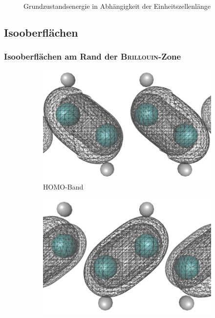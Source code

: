 \begin{frame}
\begin{minipage}{0.49\textwidth}
\begin{figure}
\captionsetup{justification = centering}
\caption{Grundzustandsenergie in Abhängigkeit der Einheitszellenlänge}
\label{image_poly_cell_len}
\end{figure}
\end{minipage}
\end{frame}

\subsection{Isooberflächen}
\begin{frame}
\frametitle{Isooberflächen am Rand der \textsc{Brillouin}-Zone}
\begin{figure}
\centering
\begin{subfigure}{0.4\textwidth}
\includegraphics[width = \textwidth]{Images/polyacetylene/wavefunctions/Homo_Cut}
\caption{HOMO-Band}
\label{image_homo1}
\end{subfigure}\hspace*{2cm}
\begin{subfigure}{0.4\textwidth}
\centering
\includegraphics[width = \textwidth]{Images/polyacetylene/wavefunctions/LUMO_Cut}

\end{subfigure}
\end{figure}
\end{frame}
